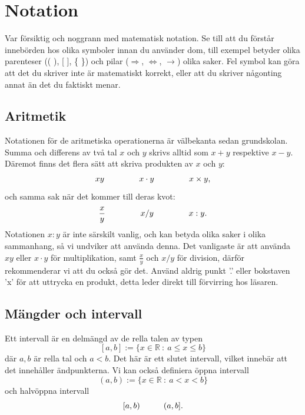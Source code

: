 \documentclass[titlepage]{article}
\begin{document}


\section{Notation}\label{ch3}

Var försiktig och noggrann med matematisk notation. Se till att du förstår innebörden hos olika symboler innan du använder dom, till exempel betyder olika parenteser (( ), [ ], \{ \}) och pilar ($\Rightarrow$, $\Leftrightarrow$, $\to$) olika saker. Fel symbol kan göra att det du skriver inte är matematiskt korrekt, eller att du skriver någonting annat än det du faktiskt menar.




\subsection{Aritmetik}

Notationen för de aritmetiska operationerna är välbekanta sedan grundskolan. Summa och differens av två tal $x$ och $y$ skrivs alltid som $x+y$ respektive $x-y$. Däremot finns det flera sätt att skriva produkten av $x$ och $y$:
$$xy \hspace{15mm} x\cdot y \hspace{15mm} x \times y,$$
och samma sak när det kommer till deras kvot:
$$\frac{x}{y} \hspace{15mm} x/y \hspace{15mm}  x : y.$$
Notationen $x:y$ är inte särskilt vanlig, och kan betyda olika saker i olika sammanhang, så vi undviker att använda denna. Det vanligaste är att använda $xy$ eller $x \cdot y$ för multiplikation, samt $\frac{x}{y}$ och $x/y$ för division, därför rekommenderar vi att du också gör det. Använd aldrig punkt '.' eller bokstaven 'x' för att uttrycka en produkt, detta leder direkt till förvirring hos läsaren.





\subsection{Mängder och intervall}

Ett intervall är en delmängd av de rella talen av typen
$$[a,b] := \{x \in \mathbb{R}\: : \: a\leq x \leq b\}$$
där $a,b$ är rella tal och $a<b$. Det här är ett slutet intervall, vilket innebär att det innehåller ändpunkterna. Vi kan också definiera öppna intervall 
$$(a,b) := \{x \in \mathbb{R} \: : \: a<x<b\}$$
och halvöppna intervall
$$[a,b) \hspace{10mm} (a,b].$$
\end{document}
